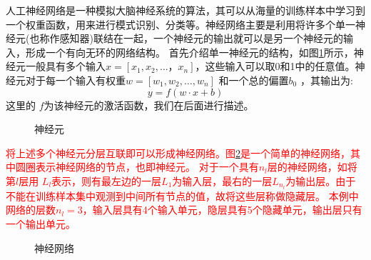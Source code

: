 
人工神经网络是一种模拟大脑神经系统的算法，其可以从海量的训练样本中学习到一个权重函数，用来进行模式识别、分类等。神经网络主要是利用将许多个单一神经元(也称作感知器)联结在一起，一个神经元的输出就可以是另一个神经元的输入，形成一个有向无环的网络结构。
首先介绍单一神经元的结构，如图\ref{fig:neural}所示，神经元一般具有多个输入$x=[x_1,x_2,\dots，x_n] $，这些输入可以取0和1中的任意值。神经元对于每一个输入有权重$w=[w_1,w_2,\dots,w_n] $ 和一个总的偏置$b_0$ ，其输出为:
\begin{equation}
  y = f(w\cdot x + b)
  \label{equ:neural}
\end{equation}
这里的 $f$为该神经元的激活函数，我们在后面进行描述。

\begin{figure}
  \centering
  
  \caption{神经元}
  \label{fig:neural}  
\end{figure}

\textcolor{red}{
将上述多个神经元分层互联即可以形成神经网络。图\ref{fig:network}是一个简单的神经网络，其中圆圈表示神经网络的节点，也即神经元。
对于一个具有$n_l$层的神经网络，如将第$ l $层用 $ L_l$表示，则有最左边的一层$  L_1$为输入层，最右的一层$ L_{n_l} $为输出层。由于不能在训练样本集中观测到中间所有节点的值，故将这些层称做隐藏层。
本例中网络的层数$ n_l=3$，输入层具有4个输入单元，隐层具有5个隐藏单元，输出层只有一个输出单元。
}

\begin{figure}
  \centering
  
  \caption{神经网络}
  \label{fig:network}  
\end{figure}


